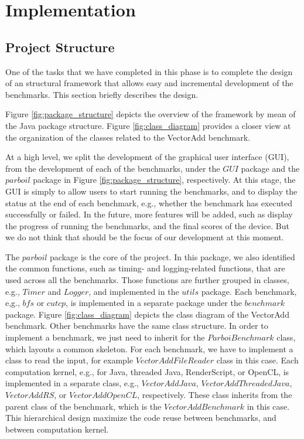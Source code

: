 
\section*{Implementation}

\subsection*{Project Structure}

One of the tasks that we have completed in this phase is to complete the design
of an structural framework that allows easy and incremental development of the
benchmarks. This section briefly describes the design.

Figure \ref{fig:package_structure} depicts the overview of the framework by mean
of the Java package structure. Figure \ref{fig:class_diagram} provides a closer
view at the organization of the classes related to the VectorAdd benchmark.

At a high level, we split the development of the graphical user interface (GUI),
from the development of each of the benchmarks, under the $GUI$ package and the
$parboil$ package in Figure \ref{fig:package_structure}, respectively. At this
stage, the GUI is simply to allow users to start running the benchmarks, and to 
display the status at the end of each benchmark, e.g., whether the benchmark has executed
successfully or failed. In the future, more features will be added, such as
display the progress of running the benchmarks, and the final scores of the
device. But we do not think that should be the focus of our development at this
moment.

The $parboil$ package is the core of the project. In this package, we
also identified the common functions, such as timing- and logging-related
functions, that are used across all the benchmarks. Those functions are further
grouped in classes, e.g., $Timer$ and $Logger$, and implemented in the $utils$
package. Each benchmark, e,g., $bfs$ or $cutcp$, is implemented in a separate
package under the $benchmark$ package. Figure \ref{fig:class_diagram} depicts
the class diagram of the VectorAdd benchmark. Other benchmarks have the same
class structure. In order to implement a benchmark, we just need to inherit for
the $ParboiBenchmark$ class, which layouts a common skeleton. For each
benchmark, we have to implement a class to read the input, for example
$VectorAddFileReader$ class in this case. Each computation kernel, e.g., for
Java, threaded Java, RenderScript, or OpenCL, is implemented in a separate
class, e.g., $VectorAddJava$, $VectorAddThreadedJava$, $VectorAddRS$, or
$VectorAddOpenCL$, respectively. These class inherits from the parent class of
the benchmark, which is the $VectorAddBenchmark$ in this case. This hierarchical
design maximize the code reuse between benchmarks, and between computation
kernel.





